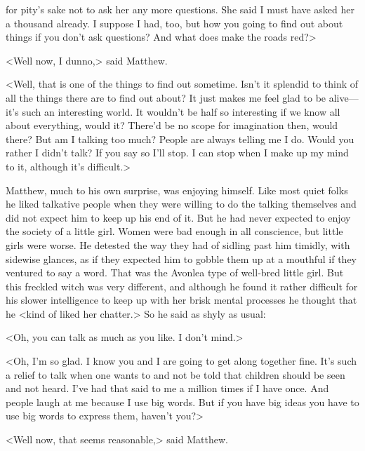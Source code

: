 for pity's sake not to ask her any more questions. She said I must have asked her a thousand already. I suppose I had, too, but how you going to find out about things if you don't ask questions? And what does make the roads red?>

<Well now, I dunno,> said Matthew.

<Well, that is one of the things to find out sometime. Isn't it splendid to think of all the things there are to find out about? It just makes me feel glad to be alive—it's such an interesting world. It wouldn't be half so interesting if we know all about everything, would it? There'd be no scope for imagination then, would there? But am I talking too much? People are always telling me I do. Would you rather I didn't talk? If you say so I'll stop. I can stop when I make up my mind to it, although it's difficult.>

Matthew, much to his own surprise, was enjoying himself. Like most quiet folks he liked talkative people when they were willing to do the talking themselves and did not expect him to keep up his end of it. But he had never expected to enjoy the society of a little girl. Women were bad enough in all conscience, but little girls were worse. He detested the way they had of sidling past him timidly, with sidewise glances, as if they expected him to gobble them up at a mouthful if they ventured to say a word. That was the Avonlea type of well-bred little girl. But this freckled witch was very different, and although he found it rather difficult for his slower intelligence to keep up with her brisk mental processes he thought that he <kind of liked her chatter.> So he said as shyly as usual:

<Oh, you can talk as much as you like. I don't mind.>

<Oh, I'm so glad. I know you and I are going to get along together fine. It's such a relief to talk when one wants to and not be told that children should be seen and not heard. I've had that said to me a million times if I have once. And people laugh at me because I use big words. But if you have big ideas you have to use big words to express them, haven't you?>

<Well now, that seems reasonable,> said Matthew.

